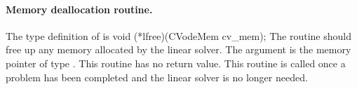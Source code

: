 
\paragraph{Memory deallocation routine.}
The type definition of  is
{
  void (*lfree)(CVodeMem cv\_mem);
}
{
  The routine  should free up any memory allocated by the linear
  solver.
}
{
  The argument  is the {\cvodes} memory pointer of type .
}
{
  This routine has no return value.
}
{
  This routine is called once a problem has been completed and the 
  linear solver is no longer needed.
}